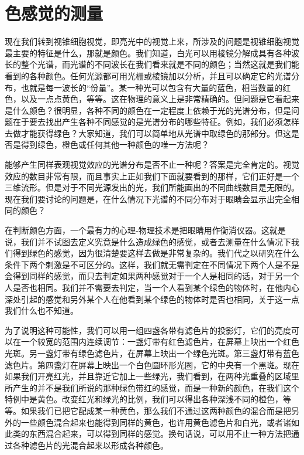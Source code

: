 \section{色感觉的测量}

现在我们转到视锥细胞视觉，即亮光中的视觉上来，所涉及的问题是视锥细胞视觉最主要的特征是什么，那就是颜色。我们知道，白光可以用棱镜分解成具有各种波长的整个光谱，而光谱的不同波长在我们看来就是不同的颜色；当然这就是我们能看到的各种颜色。任何光源都可用光栅或棱镜加以分析，并且可以确定它的光谱分布，也就是每一波长的“份量”。某一种光可以包含有大量的蓝色，相当数量的红色，以及一点点黄色，等等。这在物理的意义上是非常精确的。但问题是它看起来是什么颜色？很明显，各种不同的颜色在一定程度上依赖于光的光谱分布，但是问题在于要去找出产生各种不同感觉的是光谱分布的哪些特征。例如，我们必须怎样去做才能获得绿色？大家知道，我们可以简单地从光谱中取绿色的那部分。但这是否是得到绿色，橙色或任何其他一种颜色的唯一方法呢？

能够产生同样表观视觉效应的光谱分布是否不止一种呢？答案是完全肯定的。视觉效应的数目非常有限，而且事实上正如我们下面就要看到的那样，它们正好是一个三维流形。但是对于不同光源发出的光，我们所能画出的不同曲线数目是无限的。现在我们要讨论的问题是，在什么情况下光谱的不同分布对于眼睛会显示出完全相同的颜色？

在判断颜色方面，一个最有力的心理-物理技术是把眼睛用作衡消仪器。这就是说，我们并不试图去定义究竟是什么造成绿色的感觉，或者去测量在什么情况下我们得到绿色的感觉，因为很清楚要这样去做是非常复杂的。我们代之以研究在什么条件下两个刺激是不可区分的。这样，我们就无需判定在不同情况下两个人是不是会得到同样的感觉，而只去判定如果两种感觉对于一个人是相同的话，对于另一个人是否也相同。我们并不需要去判定，当一个人看到某个绿色的物体时，在他内心深处引起的感觉和另外某个人在他看到某个绿色的物体时是否也相同，关于这一点我们什么也不知道。

为了说明这种可能性，我们可以用一组四盏各带有滤色片的投影灯，它们的亮度可以在一个较宽的范围内连续调节：一盏灯带有红色滤色片，在屏幕上映出一个红色光斑。另一盏灯带有绿色滤色片，在屏幕上映出一个绿色光斑。第三盏灯带有蓝色滤色片。第四盏灯在屏幕上映出一个白色圆环形光圈，它的中央有一个黑斑。现在如果我们开亮红光，并且靠近它加上一些绿光，我们看到，在两种光重叠的区域里所产生的并不是我们所说的那种绿色带红的感觉，而是一种新的颜色，在我们这个特例中是黄色。改变红光和绿光的比例，我们可以得出各种深浅不同的橙色，等等。如果我们已把它配成某一种黄色，那么我们不通过这两种颜色的混合而是把另外的一些颜色混合起来也能得到同样的黄色，也许用黄色滤色片和白光，或者诸如此类的东西混合起来，可以得到同样的感觉。换句话说，可以用不止一种方法把通过各种滤色片的光混合起来以形成各种颜色。

